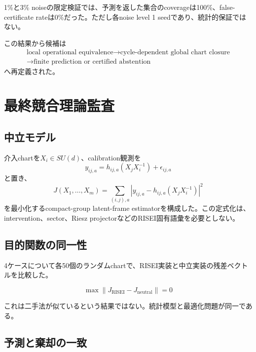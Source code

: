 \documentclass[11pt,a4paper,uplatex,dvipdfmx]{bxjsarticle}
\theoremstyle{remark}
\begin{document}
1\%と3\% noiseの限定検証では、予測を返した集合のcoverageは100\%、false-certificate rateは0\%だった。ただし各noise level 1 seedであり、統計的保証ではない。

この結果から候補は
\begin{equation}
\boxed{
\begin{gathered}
\text{local operational equivalence}
\to
\text{cycle-dependent global chart closure}\\
\to
\text{finite prediction or certified abstention}
\end{gathered}}
\end{equation}
へ再定義された。

\section{最終競合理論監査}

\subsection{中立モデル}

介入chartを$X_i\in SU(d)$、calibration観測を
\begin{equation}
y_{ij,a}=h_{ij,a}(X_jX_i^{-1})+\epsilon_{ij,a}
\end{equation}
と置き、
\begin{equation}
J(X_1,\ldots,X_m)
=
\sum_{(i,j),a}
\left|
 y_{ij,a}-h_{ij,a}(X_jX_i^{-1})
\right|^2
\label{eq:neutral-objective}
\end{equation}
を最小化するcompact-group latent-frame estimatorを構成した。この定式化は、intervention、sector、Riesz projectorなどのRISEI固有語彙を必要としない。

\subsection{目的関数の同一性}

4ケースについて各50個のランダムchartで、RISEI実装と中立実装の残差ベクトルを比較した。

\begin{equation}
\boxed{
\max
\|J_{\mathrm{RISEI}}-J_{\mathrm{neutral}}\|
=0
}
\end{equation}

これは二手法が似ているという結果ではない。統計模型と最適化問題が同一である。

\subsection{予測と棄却の一致}
\end{document}
